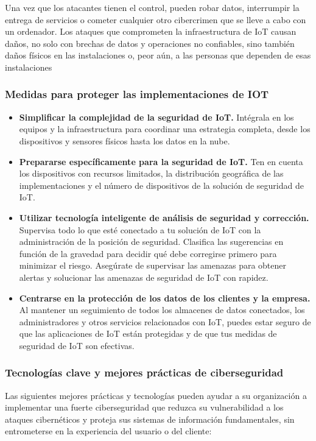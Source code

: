 \documentclass[12pt]{article}
\begin{document}
  Una vez que los atacantes tienen el control, pueden robar datos, interrumpir la entrega de servicios o cometer cualquier otro cibercrimen que se lleve a cabo con un ordenador. Los ataques que comprometen la infraestructura de IoT causan daños, no solo con brechas de datos y operaciones no confiables, sino también daños físicos en las instalaciones o, peor aún, a las personas que dependen de esas instalaciones

  \subsubsection*{Medidas para proteger las implementaciones de IOT}
  \begin{itemize}
    \item \textbf{Simplificar la complejidad de la seguridad de IoT.} Intégrala en los equipos y la infraestructura para coordinar una estrategia completa, desde los dispositivos y sensores físicos hasta los datos en la nube.
    \item \textbf{Prepararse específicamente para la seguridad de IoT.} Ten en cuenta los dispositivos con recursos limitados, la distribución geográfica de las implementaciones y el número de dispositivos de la solución de seguridad de IoT.
    \item \textbf{Utilizar tecnología inteligente de análisis de seguridad y corrección.} Supervisa todo lo que esté conectado a tu solución de IoT con la administración de la posición de seguridad. Clasifica las sugerencias en función de la gravedad para decidir qué debe corregirse primero para minimizar el riesgo. Asegúrate de supervisar las amenazas para obtener alertas y solucionar las amenazas de seguridad de IoT con rapidez.
    \item \textbf{Centrarse en la protección de los datos de los clientes y la empresa.} Al mantener un seguimiento de todos los almacenes de datos conectados, los administradores y otros servicios relacionados con IoT, puedes estar seguro de que las aplicaciones de IoT están protegidas y de que tus medidas de seguridad de IoT son efectivas.
  \end{itemize}

  \subsubsection*{Tecnologías clave y mejores prácticas de ciberseguridad}
  Las siguientes mejores prácticas y tecnologías pueden ayudar a su organización a implementar una fuerte ciberseguridad que reduzca su vulnerabilidad a los ataques cibernéticos y proteja sus sistemas de información fundamentales, sin entrometerse en la experiencia del usuario o del cliente:
\end{document}
